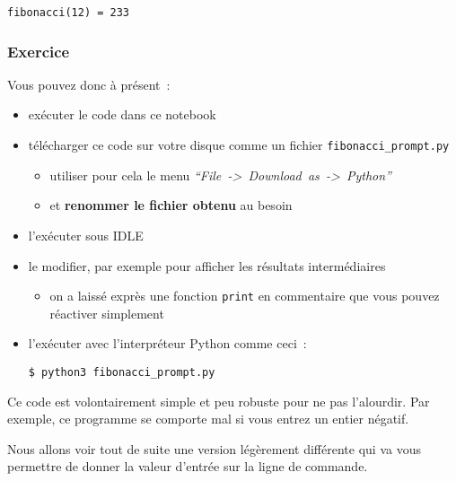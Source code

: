     \begin{Verbatim}[commandchars=\\\{\}]
fibonacci(12) = 233

    \end{Verbatim}

    \hypertarget{exercice}{%
\subsubsection{Exercice}\label{exercice}}

    Vous pouvez donc à présent~:

\begin{itemize}
\item
  exécuter le code dans ce notebook
\item
  télécharger ce code sur votre disque comme un fichier
  \texttt{fibonacci\_prompt.py}

  \begin{itemize}
  \tightlist
  \item
    utiliser pour cela le menu
    \emph{``File~-\textgreater{}~Download~as~-\textgreater{}~Python''}
  \item
    et \textbf{renommer le fichier obtenu} au besoin
  \end{itemize}
\item
  l'exécuter sous IDLE
\item
  le modifier, par exemple pour afficher les résultats intermédiaires

  \begin{itemize}
  \tightlist
  \item
    on a laissé exprès une fonction \texttt{print} en commentaire que
    vous pouvez réactiver simplement
  \end{itemize}
\item
  l'exécuter avec l'interpréteur Python comme ceci~:

  \texttt{\$\ python3\ fibonacci\_prompt.py}
\end{itemize}

    Ce code est volontairement simple et peu robuste pour ne pas l'alourdir.
Par exemple, ce programme se comporte mal si vous entrez un entier
négatif.

    Nous allons voir tout de suite une version légèrement différente qui va
vous permettre de donner la valeur d'entrée sur la ligne de commande.